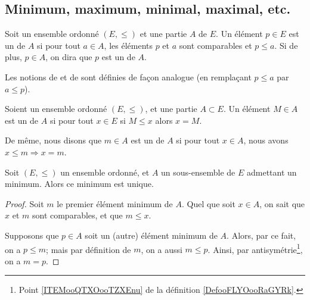 \subsection{Minimum, maximum, minimal, maximal, etc.}


\begin{definition}      \label{DEFooDNWRooTiMAzK}
	Soit un ensemble ordonné \( (E,\leq)\) et une partie \( A\) de \( E\). Un élément \( p\in E\) est un  de \( A\) si pour tout \( a\in A\), les éléments \( p\) et \( a\) sont comparables et \( p\leq a\). Si de plus, \( p \in A \), on dira que \( p \) est un  de \( A\).

	Les notions de  et de  sont définies de façon analogue (en remplaçant \( p\leq a\) par \( a\leq p\)).
\end{definition}


\begin{definition}        \label{DEFooBZNRooYRPGme}
	Soient un ensemble ordonné \( (E,\leq)\), et une partie \( A\subset E\). Un élément \(M\in A\) est un  de \( A\) si pour tout \( x\in E\) si \( M\leq x\) alors \(x=M\).

	De même, nous disons que \( m\in A\) est un  de \( A\) si pour tout \( x\in A\), nous avons \( x\leq m\Rightarrow x=m\).
\end{definition}


\begin{proposition}\label{PROPooUniciteMinMax}
	Soit \( (E, \leq) \) un ensemble ordonné, et \( A \) un sous-ensemble de \( E \) admettant un minimum. Alors ce minimum est unique.
\end{proposition}

\begin{proof}
	Soit \( m \) le premier élément minimum de \( A \). Quel que soit \(x \in A \), on sait que \( x \) et \( m \) sont comparables, et que \( m \leq x \).

	Supposons que \( p \in A \) soit un (autre) élément minimum de \( A \). Alors, par ce fait, on a \( p \leq m \); mais par définition de \( m \), on a aussi \( m \leq p \). Ainsi, par antisymétrie\footnote{Point \ref{ITEMooQTXOooTZXEnu} de la définition \ref{DefooFLYOooRaGYRk}.}, on a \( m = p\).
\end{proof}

